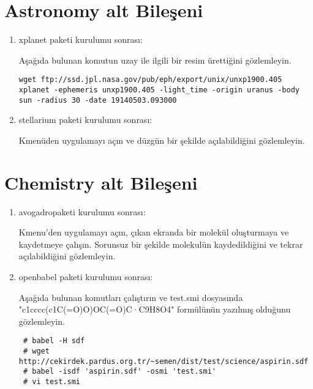 \documentclass[a4paper,10pt]{article}
\begin{document}
\section{Astronomy alt Bileşeni}
\begin{enumerate}
\item xplanet paketi kurulumu sonrası:

Aşağıda bulunan komutun uzay ile ilgili bir resim ürettiğini gözlemleyin.
\begin{verbatim}
wget ftp://ssd.jpl.nasa.gov/pub/eph/export/unix/unxp1900.405
xplanet -ephemeris unxp1900.405 -light_time -origin uranus -body sun -radius 30 -date 19140503.093000  
\end{verbatim}

 \item stellarium paketi kurulumu sonrası:

Kmenüden uygulamayı açın ve düzgün bir şekilde açılabildiğini gözlemleyin. 
\end{enumerate}

\section{Chemistry alt Bileşeni}
\begin{enumerate}
 \item avogadropaketi kurulumu sonrası:

Kmenu'den uygulamayı açın, çıkan ekranda bir molekül oluşturmaya ve kaydetmeye çalışın. Sorunsuz bir şekilde molekulün kaydedildiğini ve tekrar açılabildiğini gözlemleyin.

 \item openbabel paketi kurulumu sonrası:

Aşağıda bulunan komutları çalıştırın ve test.smi dosyasında "c1cccc(c1C(=O)O)OC(=O)C·C9H8O4" formülünün yazılmış olduğunu gözlemleyin.
\begin{verbatim}
 # babel -H sdf
 # wget http://cekirdek.pardus.org.tr/~semen/dist/test/science/aspirin.sdf
 # babel -isdf 'aspirin.sdf' -osmi 'test.smi'
 # vi test.smi
\end{verbatim}

\end{enumerate}
\end{document}
